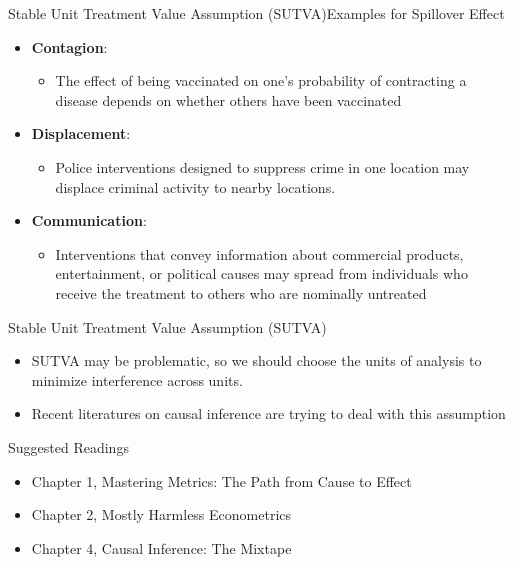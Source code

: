 \documentclass[hyperref={pdfpagelabels=false}]{beamer}
\begin{document}
\begin{frame}{Stable Unit Treatment Value Assumption (SUTVA)}{Examples for Spillover Effect}
	
		
		\begin{itemize} 
			\vspace{0.2cm}
			\item \textbf{Contagion}: 
						\vspace{0.2cm}
					\begin{itemize} 
			\item The effect of being vaccinated on one's probability of contracting a disease depends on whether others have been vaccinated
					\end{itemize}		
			\vspace{0.2cm}
			\item \textbf{Displacement}: 
			\vspace{0.2cm}
			\begin{itemize} 
			\item Police interventions designed to suppress crime in one location may displace criminal activity to nearby locations.	
								\end{itemize}				
			\vspace{0.2cm} 
			\item \textbf{Communication}:
				\vspace{0.2cm}
			\begin{itemize}  
			\item Interventions that convey information about commercial products, entertainment, or political causes may spread from individuals who receive the treatment to others who are nominally untreated
			\end{itemize}						
		\end{itemize}		
		
		

\end{frame}




\begin{frame}{Stable Unit Treatment Value Assumption (SUTVA)}
	\begin{itemize} 
		
		\item SUTVA may be problematic, so we should choose the units of analysis to minimize interference across units.
		\vspace{0.2cm}
		\item Recent literatures on causal inference are trying to deal with this assumption
		
	\end{itemize}
\end{frame}





\begin{frame}{Suggested Readings}
\begin{itemize} 
\item Chapter 1, Mastering Metrics: The Path from Cause to Effect
\vspace{0.2cm}
\item Chapter 2, Mostly Harmless Econometrics
\vspace{0.2cm}
\item Chapter 4, Causal Inference: The Mixtape
\end{itemize}
\end{frame}
\end{document}
